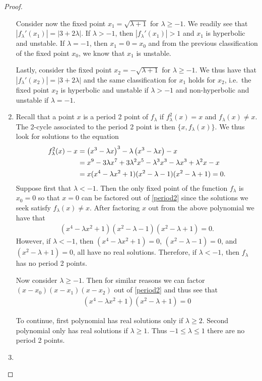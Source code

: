 \begin{proof}
\begin{enumerate}
      Consider now the fixed point $x_1 = \sqrt{\lambda + 1}$ for $\lambda \geq -1$. We readily see that $|f_\lambda'(x_1)| = |3 + 2\lambda|$.
      If $\lambda > -1$, then $|f_\lambda'(x_1)| > 1$ and $x_1$ is
      hyperbolic and unstable. If $\lambda = -1$, then $x_1 = 0 = x_0$ and from the previous
      classification of the fixed point $x_0$, we know that $x_1$ is unstable.

      Lastly, consider the fixed point $x_2 = -\sqrt{\lambda + 1}$ for $\lambda \geq -1$.
      We thus have that $|f_\lambda'(x_2)| = |3 + 2\lambda|$ and the same classification for $x_1$ holds for $x_2$, i.e.\
      the fixed point $x_2$ is hyperbolic and unstable if $\lambda > -1$ and non-hyperbolic and unstable if $\lambda = -1$.

    \item Recall that a point $x$ is a period 2 point of $f_\lambda$ if $f_\lambda^2(x) = x$ and $f_\lambda(x) \neq x$. The 2-cycle associated to the period 2 point
      is then $\{x, f_\lambda(x)\}$. We thus look for solutions to the equation
      \begin{align}\label{period2}
        f_\lambda^2(x) - x &= \left(x^3 - \lambda x\right)^3 - \lambda \left(x^3 - \lambda x\right) - x \notag\\
        &= x^9 -3 \lambda x^7 + 3 \lambda ^2 x ^5 - \lambda ^3 x^3 - \lambda x^3 + \lambda^2 x - x \notag\\
        &= x (x^4- \lambda x^2 + 1)(x^2 - \lambda -1) (x^2 - \lambda + 1) = 0.
      \end{align}
      Suppose first that $\lambda < -1$. Then the only fixed point of the function $f_\lambda$
      is $x_0 = 0$ so that $x=0$ can be factored out of \eqref{period2} since the solutions we seek satisfy $f_\lambda(x) \neq x$. After factoring $x$ out from the above polynomial we have that
      \begin{align*}
        (x^4- \lambda x^2 + 1)(x^2 - \lambda -1) (x^2 - \lambda + 1) = 0.
      \end{align*}
      However, if $\lambda < -1$, then $(x^4- \lambda x^2 + 1) = 0$, $(x^2 - \lambda -1) = 0$,
      and $(x^2 - \lambda + 1) = 0$, all have no real solutions. Therefore, if $\lambda < -1$,
      then $f_\lambda$ has no period 2 points.

      Now consider $\lambda \geq -1$. Then for similar reasons we can factor $(x - x_0)(x - x_1)(x - x_2)$
      out of \eqref{period2} and thus see that
      \begin{align*}
        (x^4- \lambda x^2 + 1)(x^2 - \lambda + 1) = 0
      \end{align*}

      To continue, first polynomial has real solutions only if $\lambda \geq 2$. Second polynomial only has real solutions if $\lambda \geq 1$.
      Thus $-1 \leq \lambda \leq 1$ there are no period 2 points.

    \item
  \end{enumerate}
\end{proof}
\newpage
